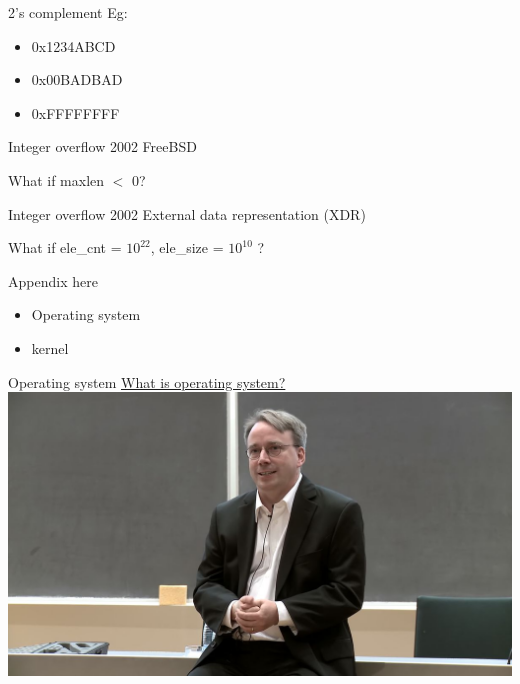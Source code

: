 \documentclass{beamer}
\begin{document}
\begin{CJK*}{UTF8}{bsmi}
    \begin{frame}{2's complement}
        Eg:
        \begin{itemize}
            \item 0x1234ABCD
            \item 0x00BADBAD
            \item 0xFFFFFFFF
        \end{itemize}
    \end{frame}

    \begin{frame}{Integer overflow}
        2002 FreeBSD
        
        What if maxlen $<$ 0?
    \end{frame}

    \begin{frame}{Integer overflow}
        2002 External data representation (XDR)
        
        What if ele\_cnt = $10^{22}$, ele\_size = $10^{10}$ ?
    \end{frame}

    \begin{frame}{Appendix here}
        \begin{itemize}
            \item Operating system
            \item kernel
        \end{itemize}
    \end{frame}

    \begin{frame}{Operating system}
        \href{https://youtu.be/vWwvh3036Fw?t=149}{What is operating system?}
        \centering\includegraphics[width=\textwidth]{Torvalds2012.jpg}
    \end{frame}


\end{CJK*}
\end{document}
